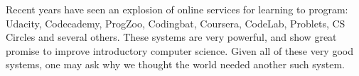 \documentclass{sig-alternate}
\begin{document}
Recent years have seen an explosion of online services for learning
to program:  Udacity\cite{udacity}, Codecademy\cite{codeacademy},
ProgZoo\cite{progzoo}, 
Codingbat\cite{codingbat}, Coursera\cite{coursera}, CodeLab\cite{turingscraft},
Problets\cite{Kumar:2005:GPA:1163405.1163408}, CS Circles\cite{Pritchard:2013:CCI:2445196.2445370} and
several others.  These systems are very powerful, and show great promise to
improve introductory computer science.  Given all of these
very good systems, one may ask why we thought
the world needed another such system.

%
%
%
%
%
\end{document}
